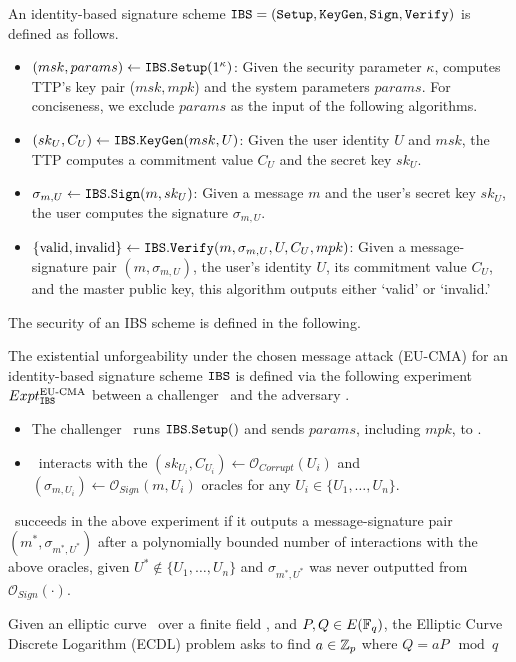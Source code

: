 \begin{definition}\label{def:ibs}

    An identity-based signature scheme $\mathtt{IBS}=(\mathtt{Setup},\mathtt{KeyGen},\mathtt{Sign},\mathtt{Verify})$ is defined as follows. 
    \begin{itemize}
        \item  $(msk,params)\gets\mathtt{IBS}.\mathtt{Setup}(1^\kappa)$: Given the security parameter $\kappa$, computes TTP's key pair ($msk,mpk$)  and the system parameters $params$. 
                For conciseness, we exclude $params$ as the input of the following algorithms.
                \item $(sk_U,C_U)\gets\mathtt{IBS}.\mathtt{KeyGen}(msk,U)$: Given the user identity $U$ and $msk$, the TTP computes a commitment value $C_U$ and the secret key $sk_U$.
                \item $\sigma_{m,U}\gets\mathtt{IBS}.\mathtt{Sign}(m,sk_U)$: Given a message $m$ and the user's secret key $sk_U$, the user computes the signature $\sigma_{m,U}$.
                \item $\{\text{valid},\text{invalid}\}\gets\mathtt{IBS}.\mathtt{Verify}(m,\sigma_{m,U},U,C_U,mpk)$: Given a message-signature pair $(m,\sigma_{m,U})$, the user's identity $U$, its commitment value $C_U$, and the master public key, this algorithm outputs either `valid' or `invalid.' 
            \end{itemize}
   
\end{definition}
The security of an IBS scheme is defined in the following.
\begin{definition}\label{def:eucma}
    The existential unforgeability under the chosen message attack (EU-CMA) for an identity-based signature scheme $\mathtt{IBS}$ is defined via the following experiment $Expt^{\text{EU-CMA}}_{\mathtt{IBS}}$ between a challenger \B~and the adversary \A. 
    \begin{itemize}
        \item The challenger \B~runs $\mathtt{IBS}.\mathtt{Setup}()$ and sends $params$, including $mpk$, to \A.
                \item \A~interacts with the $(sk_{U_i},C_{U_i})\gets\mathcal{O}_{Corrupt}({U_i})$ and $(\sigma_{m,{U_i}})\gets\mathcal{O}_{Sign}(m,{U_i})$ oracles for any ${U_i}\in \{U_1, \dots, U_n\}$. 
            \end{itemize}
       \A~succeeds in the above experiment if it outputs a message-signature pair $(m^*,\sigma_{m^*,U^*})$ after a polynomially bounded number of interactions with the above oracles, given $U^* \notin \{U_1, \dots, U_n\}$ and $\sigma_{m^*,U^*}$ was never outputted from $\mathcal{O}_{Sign}(\cdot)$.  
\end{definition}

\begin{definition}\label{def:ecdl} Given an elliptic curve \EC~over a finite field \Fq, and $P,Q\in E(\mathbb{F}_q)$, the Elliptic Curve Discrete Logarithm (ECDL) problem asks to find $a\in\mathbb{Z}_p$ where $Q=aP \mod q$
    
\end{definition}